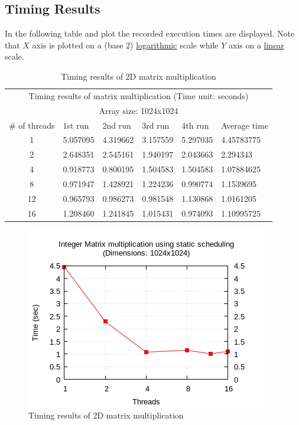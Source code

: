 \documentclass{article}
\begin{document}
\subsection{Timing Results}
In the following table and plot the recorded execution times are displayed.
Note that $X$ axis is plotted on a (base 2) \underline{logarithmic} scale while
$Y$ axis on a \underline{linear} scale.


\begin{table}[htbp]
  \centering
    \begin{tabular}{|c||l|l|l|l||l|} 
    \hline
    \multicolumn{6}{|c|}{Timing results of matrix multiplication (Time unit: seconds)} \\
    \multicolumn{6}{|c|}{Array size: 1024x1024} \\
    \hline
   \# of threads & 1st run & 2nd run & 3rd run & 4th run & Average time\\ [0.5ex] 
    \hline\hline
    1 & 5.057095 & 4.319662 & 3.157559 & 5.297035 & 4.45783775 \\ 
    \hline
    2 & 2.648351 & 2.545161 & 1.940197 & 2.043663 & 2.294343 \\
    \hline
    4 & 0.918773 & 0.800195 & 1.504583 & 1.504583 & 1.07884625 \\
    \hline
    8 & 0.971947 & 1.428921 & 1.224236 & 0.990774 & 1.1539695 \\
    \hline
    12 & 0.965793 & 0.986273 & 0.981548 & 1.130868 & 1.0161205 \\
    \hline
    16 & 1.208460 & 1.241845 & 1.015431 & 0.974093 & 1.10995725 \\ [1ex]
    \hline
    \end{tabular}
  \caption{Timing results of 2D matrix multiplication}
\end{table}


\begin{figure}[htbp]
  \centering
  \includegraphics[width=0.55\columnwidth]{../ex2/plots/matmul.png}
  \caption{Timing results of 2D matrix multiplication}
\end{figure}
\end{document}
